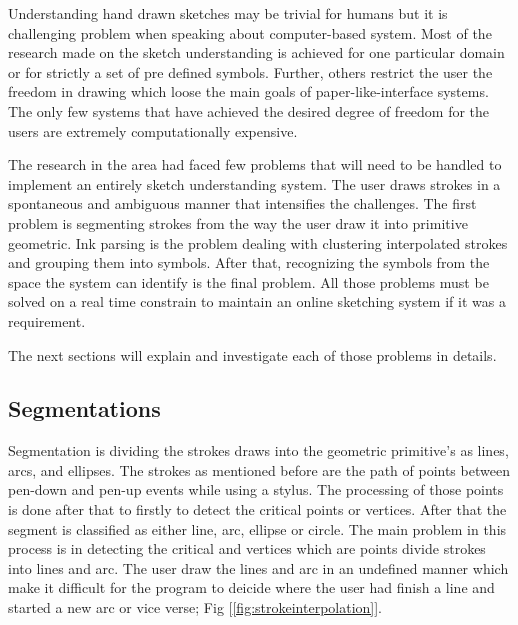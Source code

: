 

 Understanding hand drawn sketches may be trivial for humans but it is challenging problem when speaking about computer-based system. Most of the research made on the sketch understanding is achieved for one particular domain or for strictly a set of pre defined symbols. Further, others restrict the user the freedom in drawing which loose the main goals of paper-like-interface systems.  The only few systems that have achieved the desired degree of freedom for the users are extremely computationally expensive.   

The research in the area had faced few problems that will need to be handled to implement an entirely sketch understanding system. The user draws strokes in a spontaneous and ambiguous manner that intensifies the challenges. The first problem is segmenting strokes from the way the user draw it into primitive geometric. Ink parsing is the problem dealing with clustering interpolated strokes and grouping them into symbols. After that, recognizing the symbols from the space the system can identify is the final problem. All those problems must be solved on a real time constrain to maintain an online sketching system if it was a requirement.

The next sections will explain and investigate each of those problems in details.




\subsection{Segmentations}
\label{sec:Segmentations}

Segmentation is dividing the strokes draws into the geometric primitive's as lines, arcs, and ellipses. The strokes as mentioned before are the path of points between pen-down and pen-up events while using a stylus. The processing of those points is done after that to firstly to detect the critical points or vertices. After that the segment is classified as either line, arc, ellipse or circle. The main problem in this process is in detecting the critical and vertices which are points divide strokes into lines and arc. The user draw the lines and arc in an undefined manner which make it difficult for the program to deicide where the user had finish a line and started a new arc or vice verse; Fig [\ref {fig:strokeinterpolation}].



